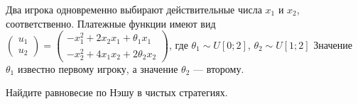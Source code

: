 \begin{problem}

Два игрока одновременно выбирают действительные числа  $x_{1} $  и  $x_{2} $, соответственно.
Платежные функции имеют вид\\
 $\left(\begin{array}{l} {u_{1} } \\ {u_{2} } \end{array}\right)=\left(\begin{array}{l} {-x_{1}^{2} +2x_{2} x_{1} +\theta _{1} x_{1} } \\ {-x_{2}^{2} +4x_{1} x_{2} +2\theta _{2} x_{2} } \end{array}\right)$, где  $\theta _{1} \sim U\left[0;2\right]$,  $\theta _{2} \sim U\left[1;2\right]$
Значение  $\theta _{1} $  известно первому игроку, а значение  $\theta _{2} $  --- второму.

Найдите равновесие по Нэшу в чистых стратегиях.



\begin{sol}

\end{sol}
\end{problem}



